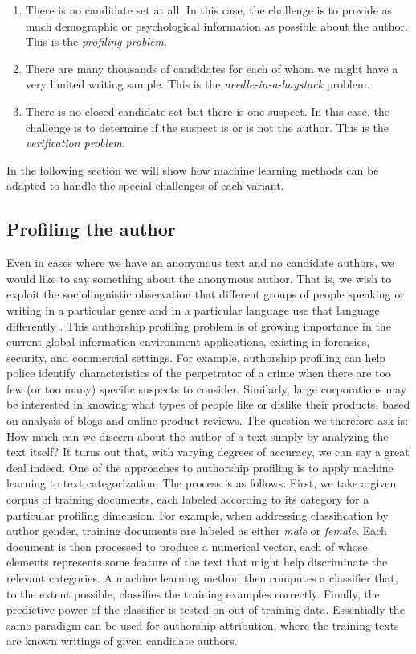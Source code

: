 \begin{enumerate}
	\item There is no candidate set at all. In this case, the challenge is to provide as much demographic or psychological information as possible about the author. This is the \textit{profiling problem}.
	\item There are many thousands of candidates for each of whom we might have a very limited writing sample. This is the \textit{needle-in-a-haystack} problem.
	\item There is no closed candidate set but there is one suspect. In this case, the challenge is to determine if the suspect is or is not the author. This is the \textit{verification problem}.
\end{enumerate}

In the following section we will show how machine learning methods can be adapted to handle the special challenges of each variant.

\subsection{Profiling the author}
Even in cases where we have an anonymous text and no candidate authors, we would like to say something about the anonymous author. That is, we wish to exploit the sociolinguistic observation that different groups of people speaking or writing in a particular genre and in a particular language use that language differently \cite{chambers2004handbook}.
This authorship profiling problem is of growing importance in the current global information environment applications, existing in forensics, security, and commercial settings. For example, authorship profiling can help police identify characteristics of the perpetrator of a crime when there are too few (or too many) specific suspects to consider. Similarly, large corporations may be interested in knowing what types of people like or dislike their products, based on analysis of blogs and online product reviews. The question we therefore ask is: How much can we discern about the author of a text simply by analyzing the text itself? It turns out that, with varying degrees of accuracy, we can say a great deal indeed.
One of the approaches to authorship profiling is to apply machine learning to text categorization. The process is as follows: First, we take a given corpus of training documents, each labeled according to its category for a particular profiling dimension. For example, when addressing classification by author gender, training documents are labeled as either \textit{male} or \textit{female}. Each document is then processed to produce a numerical vector, each of whose elements represents some feature of the text that might help discriminate the relevant categories. A machine learning method then computes a classifier that, to the extent possible, classifies the training examples correctly. Finally, the predictive power of the classifier is tested on out-of-training data.
Essentially the same paradigm can be used for authorship attribution, where the training texts are known writings of given candidate authors.\cite{juola2008authorship}


